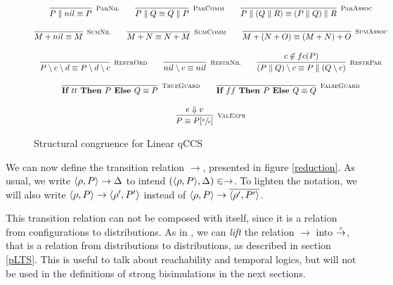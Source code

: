 \begin{figure}[h!]
\begin{gather*}
    \infer[\mbox{\footnotesize\scshape ParNil}]{P \parallel nil \equiv P}{} \qquad
    \infer[\mbox{\footnotesize\scshape ParComm}]{P \parallel Q \equiv Q \parallel P}{} \qquad
    \infer[\mbox{\footnotesize\scshape ParAssoc}]{P \parallel (Q \parallel R) \equiv (P \parallel Q) \parallel R}{} 
    \\[0.3cm]
    \infer[\mbox{\footnotesize\scshape SumNil}]{M + nil \equiv M}{} \qquad
    \infer[\mbox{\footnotesize\scshape SumComm}]{M + N \equiv N + M}{} \qquad
    \infer[\mbox{\footnotesize\scshape SumAssoc}]{M + (N + O) \equiv (M + N) + O}{} 
    \\[0.3cm]
    \infer[\mbox{\footnotesize\scshape RestrOrd}]{P \setminus c \setminus d \equiv P \setminus d \setminus c}{} \qquad 
    \infer[\mbox{\footnotesize\scshape RestrNil}]{nil \setminus c \equiv nil}{} \qquad 
    \infer[\mbox{\footnotesize\scshape RestrPar}]{(P \parallel Q) \setminus c \equiv P \parallel (Q \setminus c)}{c \not\in fc(P)} \\[0.3cm]
    \infer[\mbox{\footnotesize\scshape TrueGuard}]{\ITE{tt}{P}{Q} \equiv P}{} \qquad
    \infer[\mbox{\footnotesize\scshape FalseGuard}]{\ITE{ff}{P}{Q} \equiv Q}{} \\[0.3cm]
    \infer[\mbox{\footnotesize\scshape ValExpr}]{ P \equiv P[\sfrac{v}{e}] }{e \Downarrow v} 
	\end{gather*}	
\caption{Structural congruence for Linear qCCS}
\label{str_cong}
\end{figure}

We can now define the transition relation $\rightarrow$, presented in figure \ref{reduction}. As usual, we write $\langle\rho, P\rangle \rightarrow \Delta$ to intend $(\langle\rho, P\rangle, \Delta) \in \rightarrow$. To lighten the notation, we will also write $\langle\rho, P\rangle \rightarrow \langle\rho', P'\rangle$ instead of $\langle\rho, P\rangle \rightarrow \overline{\langle\rho', P'\rangle}$.

This transition relation can not be composed with itself, since it is a relation from configurations to distributions. As in \cite{fengBisimulationQuantumProcesses2012}, we can \textit{lift} the relation $\rightarrow$ into $\stackrel{\scriptscriptstyle \circ}{\rightarrow}$, that is a relation from distributions to distributions, as described in section \ref{pLTS}. This is useful to talk about reachability and temporal logics, but will not be used in the definitions of strong bisimulations in the next sections.

